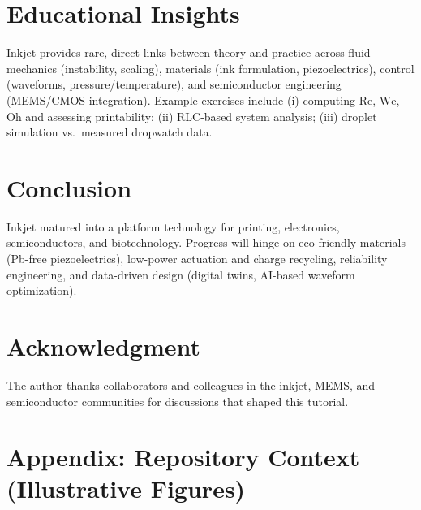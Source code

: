 \documentclass[conference]{IEEEtran}
\newcommand{\Oh}{\mathrm{Oh}}
\newcommand{\We}{\mathrm{We}}
\newcommand{\Rey}{\mathrm{Re}}
\begin{document}
\section{Educational Insights}
Inkjet provides rare, direct links between theory and practice across fluid mechanics (instability, scaling), materials (ink formulation, piezoelectrics), control (waveforms, pressure/temperature), and semiconductor engineering (MEMS/CMOS integration). Example exercises include (i) computing $\Rey$, $\We$, $\Oh$ and assessing printability; (ii) RLC-based system analysis; (iii) droplet simulation vs.\ measured dropwatch data.

\section{Conclusion}
Inkjet matured into a platform technology for printing, electronics, semiconductors, and biotechnology. Progress will hinge on eco-friendly materials (Pb-free piezoelectrics), low-power actuation and charge recycling, reliability engineering, and data-driven design (digital twins, AI-based waveform optimization).

\section*{Acknowledgment}
The author thanks collaborators and colleagues in the inkjet, MEMS, and semiconductor communities for discussions that shaped this tutorial.

\section*{Appendix: Repository Context (Illustrative Figures)}

\end{document}
